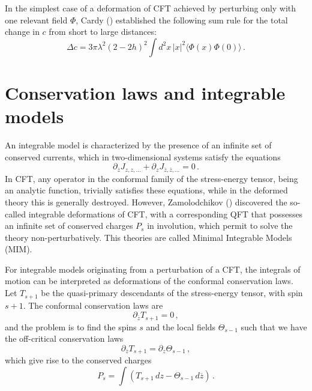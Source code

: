 \documentclass[a4paper,12pt]{report}
\begin{document}
In the simplest case of a deformation of CFT achieved by perturbing only with one relevant field $\Phi$, Cardy
(\cite{Cardysum}) established the following sum rule for the total change in $c$ from short to large distances:
\begin{equation}\label{Cardysum}
\Delta c=3\pi \lambda ^{2}\left(2-2 h \right)^{2}\int d^{2}x\,|x| ^{2}\langle\Phi (x)\Phi (0)\rangle \,.
\end{equation}

\vspace{1cm}

\section{Conservation laws and integrable models}

An integrable model is characterized by the presence of an infinite set of conserved currents, which in
two-dimensional systems satisfy the equations
\begin{equation}
\partial _{\overline{z}}J_{z,z,...}+\partial _{z}J_{\overline{z},\overline{z},...}=0 \,.
\end{equation}
In CFT, any operator in the conformal family of the stress-energy tensor, being an analytic function, trivially
satisfies these equations, while in the deformed theory this is generally destroyed. However, Zamolodchikov
(\cite{sbrind}) discovered the so-called integrable deformations of CFT, with a corresponding QFT that possesses
an infinite set of conserved charges $P_{s}$ in involution, which permit to solve the theory non-perturbatively.
This theories are called Minimal Integrable Models (MIM).

For integrable models originating from a perturbation of a CFT, the integrals of motion can be interpreted as
deformations of the conformal conservation laws. Let $T_{s+1}$ be the quasi-primary descendants of the
stress-energy tensor, with spin $s+1$. The conformal conservation laws are
\begin{equation}
\partial _{\overline{z}}T_{s+1}=0 \,,
\end{equation}
and the problem is to find the spins $s$ and the local fields $\Theta _{s-1}$ such that we have the off-critical
conservation laws
\begin{equation}\label{offcritcons}
\partial _{\overline{z}}T_{s+1}=\partial _{z}\Theta _{s-1}\,,
\end{equation}
which give rise to the conserved charges
\begin{equation}
P_{s}=\int\left(T_{s+1}\, dz -\Theta _{s-1} \, d\overline{z} \right)\,.
\end{equation}
\end{document}

